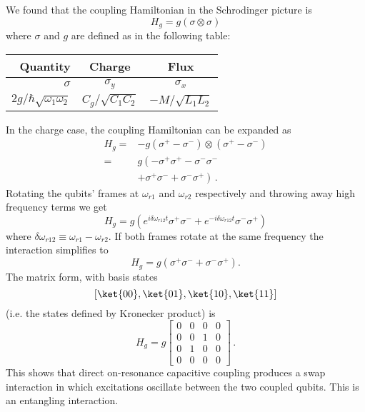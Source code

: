 We found that the coupling Hamiltonian in the Schrodinger picture is
\begin{equation}
  H_g = g \left( \sigma \otimes \sigma \right)
\end{equation}
where $\sigma$ and $g$ are defined as in the following table:
\begin{center}
  \begin{tabular}{r|cc}
    \hline
    \textbf{Quantity} & \textbf{Charge} & \textbf{Flux} \\
    \hline
    $\sigma$ & $\sigma_y$ & $\sigma_x$ \\

    $2g / \hbar \sqrt{\omega_1 \omega_2}$ & $C_g / \sqrt{C_1 C_2}$ & $-M/\sqrt{L_1L_2}$ \\
    \hline
  \end{tabular}
\end{center}
In the charge case, the coupling Hamiltonian can be expanded as
\begin{align}
  H_g
    =& -g (\sigma^+ - \sigma^-) \otimes (\sigma^+ - \sigma^-) \nonumber \\
    =& g \left(-\sigma^+ \sigma^+ - \sigma^- \sigma^- \right. \nonumber \\
     & \left. + \sigma^+ \sigma^- + \sigma^- \sigma^+ \right) \, .
\end{align}
Rotating the qubits' frames at $\omega_{r1}$ and $\omega_{r2}$ respectively and throwing away high frequency terms we get
\begin{equation}
  H_g = g
  \left(
      e^{ i \delta\omega_{r12} t} \sigma^+ \sigma^-
    + e^{-i \delta\omega_{r12} t} \sigma^- \sigma^+
  \right)
\end{equation}
where $\delta\omega_{r12}\equiv \omega_{r1} - \omega_{r2}$.
If both frames rotate at the same frequency the interaction simplifies to
\begin{equation}
  H_g = g \left( \sigma^+ \sigma^- + \sigma^- \sigma^+ \right).
\end{equation}
The matrix form, with basis states
\begin{equation*}
  \left[ \ket{00}, \ket{01}, \ket{10}, \ket{11} \right]
\end{equation*}
(i.e. the states defined by Kronecker product) is
\begin{equation}
  H_g =
  g \left[ \begin{array}{cccc}
    0 & 0 & 0 & 0 \\
    0 & 0 & 1 & 0 \\
    0 & 1 & 0 & 0 \\
    0 & 0 & 0 & 0
  \end{array} \right] \, .
\end{equation}
This shows that direct on-resonance capacitive coupling produces a swap interaction in which excitations oscillate between the two coupled qubits.
This is an entangling interaction.
